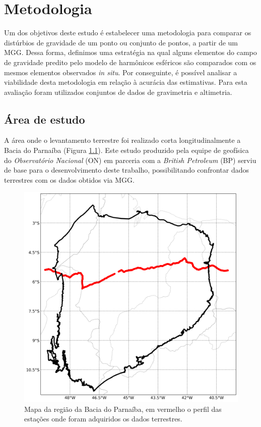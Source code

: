 \chapter{Metodologia}
Um dos objetivos deste estudo é estabelecer uma metodologia para comparar os distúrbios de gravidade de um ponto ou conjunto de pontos, a partir de um MGG. Dessa forma, definimos uma estratégia na qual alguns elementos do campo de gravidade predito pelo modelo de harmônicos esféricos são comparados com os mesmos elementos observados \textit{in situ}. Por conseguinte, é possível analisar a viabilidade desta metodologia em relação à acurácia das estimativas. Para esta avaliação foram utilizados conjuntos de dados de gravimetria e altimetria.

\section{Área de estudo}

A área onde o levantamento terrestre foi realizado corta longitudinalmente a Bacia do Parnaíba (Figura \ref{fig:bacia do parnaiba}). Este estudo produzido pela equipe de geofísica do \textit{Observatório Nacional} (ON) em parceria com a \textit{British Petroleum} (BP) serviu de base para o desenvolvimento deste trabalho, possibilitando confrontar dados terrestres com os dados obtidos via MGG.

\begin{figure}[h]
	\centering
	\includegraphics[scale=0.25]{figs/bacia do parnaiba.png}
	\caption{Mapa da região da Bacia do Parnaíba, em vermelho o perfil das estações onde foram adquiridos os dados terrestres.}
	\label{fig:bacia do parnaiba}
\end{figure}


